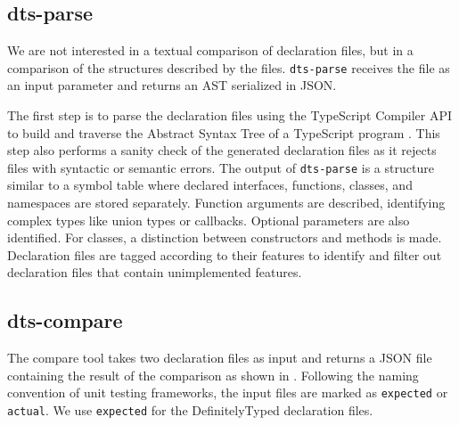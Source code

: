 \documentclass[sigconf]{acmart}
\begin{document}
\subsection{dts-parse}
\label{sec:dts-parse}

We are not interested in a textual comparison of declaration files, but in a
comparison of the structures described by the
files. \texttt{dts-parse} receives the file as an input
parameter and returns an AST serialized in JSON.

The first step is to parse the declaration files using the TypeScript
Compiler API to build and traverse the 
Abstract Syntax Tree of a TypeScript program
\cite{typescript-compiler-api}. 
This step also performs a sanity check of the generated declaration
files as it rejects files with syntactic or semantic errors.
The output of \texttt{dts-parse} is a structure similar to a symbol table where declared
{interfaces}, {functions}, {classes}, and
{namespaces} are stored separately. Function arguments are
described, identifying complex types like union types or
callbacks. Optional parameters are also identified. For
{classes}, a distinction between constructors and methods
is made. Declaration files are tagged according to their features to identify and filter out declaration files
that contain unimplemented features.



\subsection{dts-compare}
\label{sec:dts-compare}

The compare tool takes two declaration files as input and returns a
JSON file containing the result of the comparison as shown in
. Following the naming convention of unit
testing frameworks, the input files are marked as \lstinline{expected} or
\lstinline{actual}. We use \lstinline{expected} for the DefinitelyTyped
declaration files. 
\end{document}
